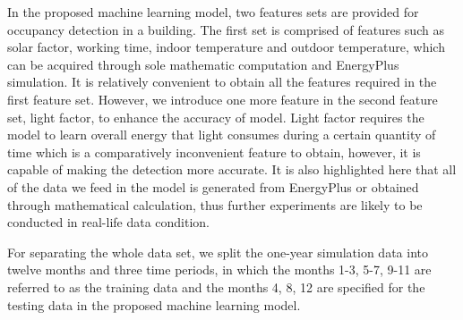 
\textcolor{feb18rev}{In the proposed machine learning model, two features sets are provided
for occupancy detection in a building. The first set is comprised of features such as solar factor,
working time, indoor temperature and outdoor temperature, which can be acquired through sole mathematic computation and
EnergyPlus simulation.} It is relatively convenient to obtain all the
features required in the first feature set. However, we introduce one
more feature in the second feature set, light factor, to enhance the
accuracy of model. Light factor requires the model to learn overall
energy that light consumes during a certain quantity of time which is
a comparatively inconvenient feature to obtain, however, it is capable
of making the detection more accurate. It is also highlighted here
that all of the data we feed in the model is generated from EnergyPlus
or obtained through mathematical calculation, thus further experiments
are likely to be conducted in real-life data condition.

For separating the whole data set, we split the one-year simulation
data into twelve months and three time periods, in which the months
1-3, 5-7, 9-11 are referred to as the training data and the months 4,
8, 12 are specified for the testing data in the proposed machine
learning model.

